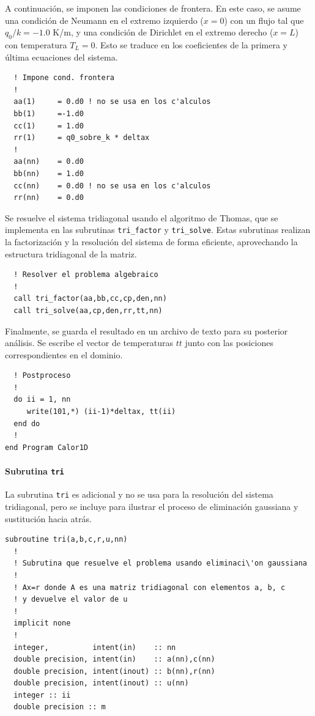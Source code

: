 \documentclass[11pt,a4paper]{article}
\begin{document}
A continuaci\'on, se imponen las condiciones de frontera. En este caso, 
se asume una condici\'on de Neumann en el extremo izquierdo ($x=0$) con un 
flujo tal que  $q_0 / k = -1\textrm{.}0$ K/m, y una condici\'on de 
Dirichlet en el extremo derecho ($x=L$) 
con temperatura $T_L=0$. Esto se traduce en los coeficientes de la primera y 
\'ultima ecuaciones del sistema.

\begin{verbatim}
  ! Impone cond. frontera
  !
  aa(1)     = 0.d0 ! no se usa en los c'alculos
  bb(1)     =-1.d0
  cc(1)     = 1.d0
  rr(1)     = q0_sobre_k * deltax
  !  
  aa(nn)    = 0.d0
  bb(nn)    = 1.d0
  cc(nn)    = 0.d0 ! no se usa en los c'alculos
  rr(nn)    = 0.d0 
\end{verbatim}

Se resuelve el sistema tridiagonal usando el algoritmo de Thomas, que se 
implementa en las subrutinas \verb|tri_factor| y \verb|tri_solve|. Estas
subrutinas realizan la factorizaci\'on y la resoluci\'on del sistema de 
forma eficiente, aprovechando la estructura tridiagonal de la matriz.

\begin{verbatim}
  ! Resolver el problema algebraico
  !
  call tri_factor(aa,bb,cc,cp,den,nn)
  call tri_solve(aa,cp,den,rr,tt,nn)
\end{verbatim}

Finalmente, se guarda el resultado en un archivo de texto para su posterior
an\'alisis. Se escribe el vector de temperaturas $tt$ junto con las posiciones
correspondientes en el dominio.

\begin{verbatim}
  ! Postproceso
  !
  do ii = 1, nn
     write(101,*) (ii-1)*deltax, tt(ii)
  end do
  !
end Program Calor1D
\end{verbatim}

\paragraph{Subrutina \texttt{tri}}  

\medskip

La subrutina \verb|tri| es adicional y no se usa para la resoluci\'on del 
sistema tridiagonal, pero se incluye para ilustrar el proceso de 
eliminaci\'on gaussiana y sustituci\'on hacia atr\'as.

\begin{verbatim}
subroutine tri(a,b,c,r,u,nn)
  !
  ! Subrutina que resuelve el problema usando eliminaci\'on gaussiana
  !
  ! Ax=r donde A es una matriz tridiagonal con elementos a, b, c
  ! y devuelve el valor de u
  !
  implicit none
  !
  integer,          intent(in)    :: nn
  double precision, intent(in)    :: a(nn),c(nn)
  double precision, intent(inout) :: b(nn),r(nn)
  double precision, intent(inout) :: u(nn)
  integer :: ii
  double precision :: m
\end{verbatim}
\end{document}

